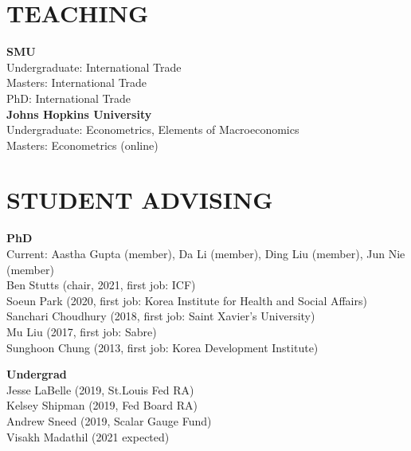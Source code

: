\documentclass[11pt]{res}
\begin{document}
\begin{resume}
\section{TEACHING} \vspace{1.5mm}
\textbf{SMU}\vspace{1.5mm}\\
Undergraduate: International Trade\vspace{1.5mm}\\
Masters: International Trade\vspace{1.5mm}\\
PhD: International Trade\vspace{4mm}\\
\textbf{Johns Hopkins University}\vspace{1.5mm}\\
Undergraduate: Econometrics, Elements of Macroeconomics\vspace{1.5mm}\\
Masters: Econometrics (online)

\section{STUDENT ADVISING} \vspace{1.5mm}
\textbf{PhD}\vspace{1.5mm}\\
Current: Aastha Gupta (member), Da Li (member), Ding Liu (member), Jun Nie (member)\vspace{1.5mm}\\
Ben Stutts (chair, 2021, first job: ICF)\vspace{1.5mm}\\
Soeun Park (2020, first job: Korea Institute for Health and Social Affairs)\vspace{1.5mm}\\
Sanchari Choudhury (2018, first job: Saint Xavier's University)\vspace{1.5mm}\\
Mu Liu (2017, first job: Sabre)\vspace{1.5mm}\\
Sunghoon Chung (2013, first job: Korea Development Institute)

\textbf{Undergrad}\vspace{1.5mm}\\
Jesse LaBelle (2019, St.Louis Fed RA)\vspace{1.5mm}\\
Kelsey Shipman (2019, Fed Board RA)\vspace{1.5mm}\\
Andrew Sneed (2019, Scalar Gauge Fund)\vspace{1.5mm}\\
Visakh Madathil (2021 expected)


\end{resume}
\end{document}
